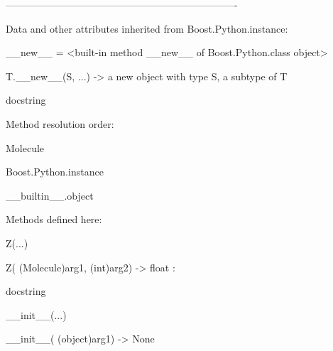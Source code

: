 \documentclass[letterpaper,10pt,english]{sphinxmanual}
\begin{document}
\begin{description}
\begin{description}
\begin{DUlineblock}{0em}
\item[] ----------------------------------------------------------------------
\item[] Data and other attributes inherited from Boost.Python.instance:
\item[] 
\item[] \_\_new\_\_ = \textless{}built-in method \_\_new\_\_ of Boost.Python.class object\textgreater{}
\item[]
\begin{DUlineblock}{\DUlineblockindent}
\item[] T.\_\_new\_\_(S, ...) -\textgreater{} a new object with type S, a subtype of T
\end{DUlineblock}
\end{DUlineblock}

\item[{class Molecule(Boost.Python.instance)}] \leavevmode
\begin{DUlineblock}{0em}
\item[] docstring
\item[] 
\item[] Method resolution order:
\item[]
\begin{DUlineblock}{\DUlineblockindent}
\item[] Molecule
\item[] Boost.Python.instance
\item[] \_\_builtin\_\_.object
\item[] 
\end{DUlineblock}
\item[] Methods defined here:
\item[] 
\item[] Z(...)
\item[]
\begin{DUlineblock}{\DUlineblockindent}
\item[] Z( (Molecule)arg1, (int)arg2) -\textgreater{} float :
\item[]
\begin{DUlineblock}{\DUlineblockindent}
\item[] docstring
\item[] 
\end{DUlineblock}
\end{DUlineblock}
\item[] \_\_init\_\_(...)
\item[]
\begin{DUlineblock}{\DUlineblockindent}
\item[] \_\_init\_\_( (object)arg1) -\textgreater{} None

\end{DUlineblock}
\end{DUlineblock}
\end{description}
\end{description}
\end{document}
